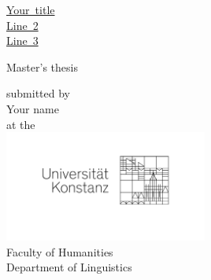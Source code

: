 \thispagestyle{empty}
\begin{center}
  \begin{sffamily}
    \begin{bfseries}
      \begin{LARGE}
	\mbox{\ul{Your title}}\\%
	\mbox{\ul{Line 2}}\\%
	\mbox{\ul{Line 3}}\\%
	\vspace{15mm}
      \end{LARGE}
      \begin{Large}
	\Large
    Master's thesis \\
      \end{Large}
    \end{bfseries}
    \begin{mdseries}
      \begin{large}
	\vspace{12mm}
	submitted by \\[0.6\baselineskip]
	Your name\\
	\vspace{12mm}
	at the\\[\baselineskip]
	{\includegraphics[width=0.5\textwidth]{./tex/figures/UniKonstanz-Logo-Optimum-sRGB.jpg}}\\
	\vspace{12mm}
	Faculty of Humanities\\[0.6\baselineskip]
	Department of Linguistics\\
      \end{large}
    \end{mdseries}
  \end{sffamily}

\end{center}

